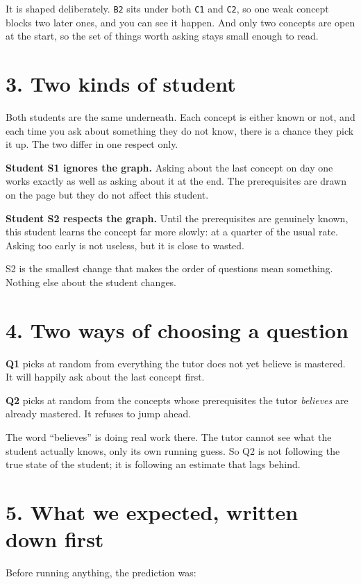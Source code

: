 \documentclass[11pt]{article}
\newcommand{\code}[1]{\texttt{\small #1}}
\begin{document}
\noindent It is shaped deliberately. \code{B2} sits under both \code{C1}
and \code{C2}, so one weak concept blocks two later ones, and you can see
it happen. And only two concepts are open at the start, so the set of
things worth asking stays small enough to read.

\section*{3. Two kinds of student}

Both students are the same underneath. Each concept is either known or
not, and each time you ask about something they do not know, there is a
chance they pick it up. The two differ in one respect only.

\textbf{Student S1 ignores the graph.} Asking about the last concept on
day one works exactly as well as asking about it at the end. The
prerequisites are drawn on the page but they do not affect this student.

\textbf{Student S2 respects the graph.} Until the prerequisites are
genuinely known, this student learns the concept far more slowly: at a
quarter of the usual rate. Asking too early is not useless, but it is
close to wasted.

S2 is the smallest change that makes the order of questions mean
something. Nothing else about the student changes.

\section*{4. Two ways of choosing a question}

\textbf{Q1} picks at random from everything the tutor does not yet believe
is mastered. It will happily ask about the last concept first.

\textbf{Q2} picks at random from the concepts whose prerequisites the
tutor \emph{believes} are already mastered. It refuses to jump ahead.

The word ``believes'' is doing real work there. The tutor cannot see what
the student actually knows, only its own running guess. So Q2 is not
following the true state of the student; it is following an estimate that
lags behind.

\section*{5. What we expected, written down first}

Before running anything, the prediction was:
\end{document}
